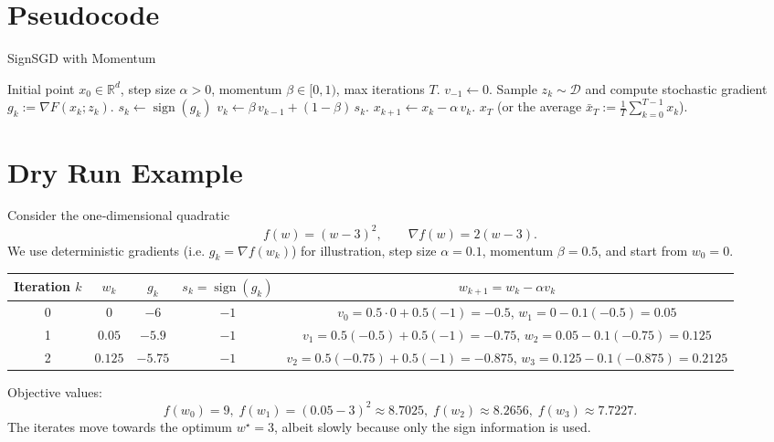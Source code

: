 \documentclass[11pt]{article}
\newcommand{\sign}{\operatorname{sign}}
\newcommand{\R}{\mathbb{R}}
\begin{document}
\section{Pseudocode}
\begin{algorithm}[H]
\caption{SignSGD with Momentum}
\begin{algorithmic}[1]
\Require Initial point $x_0\in\R^{d}$, step size $\alpha>0$, momentum $\beta\in[0,1)$, max iterations $T$.
\State $v_{-1}\gets 0$.
    \State Sample $z_k\sim\mathcal{D}$ and compute stochastic gradient $g_k:=\nabla F(x_k;z_k)$.
    \State $s_k \gets \sign(g_k)$ \hfill{}
    \State $v_k \gets \beta\, v_{k-1} + (1-\beta)\, s_k$.
    \State $x_{k+1} \gets x_k - \alpha\, v_k$.
\EndFor
\State \Return $x_T$ (or the average $\bar x_T:=\frac1T\sum_{k=0}^{T-1}x_k$).
\end{algorithmic}
\end{algorithm}

\section{Dry Run Example}
Consider the one‑dimensional quadratic
\[
f(w) = (w-3)^2,\qquad \nabla f(w)=2(w-3).
\]
We use deterministic gradients (i.e. $g_k=\nabla f(w_k)$) for illustration,
step size $\alpha=0.1$, momentum $\beta=0.5$, and start from $w_0=0$.

\medskip
\begin{tabular}{c|c|c|c|c}
Iteration $k$ & $w_k$ & $g_k$ & $s_k=\sign(g_k)$ & $w_{k+1}=w_k-\alpha v_k$\\ \hline
0 & $0$ & $-6$ & $-1$ & $v_0=0.5\cdot0+0.5(-1)=-0.5$, $w_1=0-0.1(-0.5)=0.05$\\
1 & $0.05$ & $-5.9$ & $-1$ & $v_1=0.5(-0.5)+0.5(-1)=-0.75$, $w_2=0.05-0.1(-0.75)=0.125$\\
2 & $0.125$ & $-5.75$ & $-1$ & $v_2=0.5(-0.75)+0.5(-1)=-0.875$, $w_3=0.125-0.1(-0.875)=0.2125$
\end{tabular}

\medskip
Objective values:
\[
f(w_0)=9,\; f(w_1)=(0.05-3)^2\approx 8.7025,\; f(w_2)\approx 8.2656,\; f(w_3)\approx 7.7227.
\]
The iterates move towards the optimum $w^\star=3$, albeit slowly because only the sign information is used.

\newpage
\end{document}
